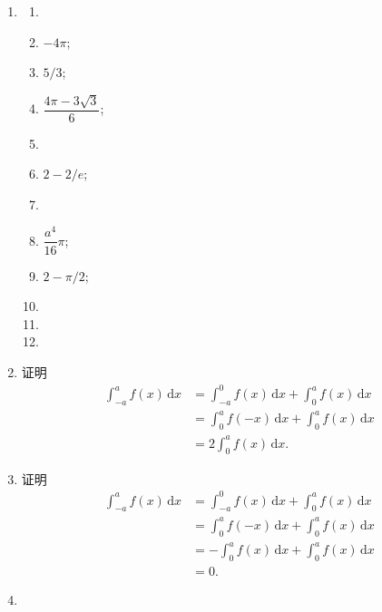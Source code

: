 \documentclass[a4paper, 11pt]{ctexart}
\newcommand{\dif}{\mathrm{d}}
\begin{document}
\begin{enumerate}
    \item %
        \begin{multicols}{4}
            \begin{enumerate}[(1)]
                \item %
                \item %
                    $-4\pi$;
                \item %
                    $5/3$;
                \item %
                    $\dfrac{4\pi - 3\sqrt3}{6}$;
                \item %
                \item %
                    $2 - 2/e$;
                \item %
                \item %
                    $\dfrac{a^4}{16}\pi$;
                \item %
                    $2 - \pi/2$;
                \item %
                \item %
                \item %
            \end{enumerate}
        \end{multicols}
    \item %
        {\heiti 证明}\quad \begin{align*}
            \int_{-a}^a f(x)\,\dif x &= \int_{-a}^0 f(x)\,\dif x + \int_0^a f(x)\,\dif x \\
                                     &= \int_0^a f(-x)\,\dif x + \int_0^a f(x)\,\dif x \\
                                     &= 2\int_0^a f(x)\,\dif x.
        \end{align*}
    \item %
        {\heiti 证明}\quad \begin{align*}
            \int_{-a}^a f(x)\,\dif x &= \int_{-a}^0 f(x)\,\dif x + \int_0^a f(x)\,\dif x \\
                                     &= \int_0^a f(-x)\,\dif x + \int_0^a f(x)\,\dif x \\
                                     &= -\int_0^a f(x)\,\dif x + \int_0^a f(x)\,\dif x \\
                                     &= 0.
        \end{align*}
    \item %

\end{enumerate}
\end{document}
